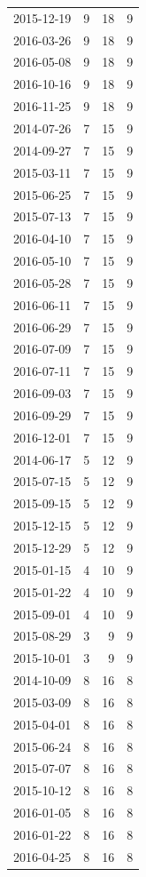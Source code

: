 \begin{tabular}{lrrr}
2015-12-19 & 9 & 18 & 9 \\
2016-03-26 & 9 & 18 & 9 \\
2016-05-08 & 9 & 18 & 9 \\
2016-10-16 & 9 & 18 & 9 \\
2016-11-25 & 9 & 18 & 9 \\
2014-07-26 & 7 & 15 & 9 \\
2014-09-27 & 7 & 15 & 9 \\
2015-03-11 & 7 & 15 & 9 \\
2015-06-25 & 7 & 15 & 9 \\
2015-07-13 & 7 & 15 & 9 \\
2016-04-10 & 7 & 15 & 9 \\
2016-05-10 & 7 & 15 & 9 \\
2016-05-28 & 7 & 15 & 9 \\
2016-06-11 & 7 & 15 & 9 \\
2016-06-29 & 7 & 15 & 9 \\
2016-07-09 & 7 & 15 & 9 \\
2016-07-11 & 7 & 15 & 9 \\
2016-09-03 & 7 & 15 & 9 \\
2016-09-29 & 7 & 15 & 9 \\
2016-12-01 & 7 & 15 & 9 \\
2014-06-17 & 5 & 12 & 9 \\
2015-07-15 & 5 & 12 & 9 \\
2015-09-15 & 5 & 12 & 9 \\
2015-12-15 & 5 & 12 & 9 \\
2015-12-29 & 5 & 12 & 9 \\
2015-01-15 & 4 & 10 & 9 \\
2015-01-22 & 4 & 10 & 9 \\
2015-09-01 & 4 & 10 & 9 \\
2015-08-29 & 3 & 9 & 9 \\
2015-10-01 & 3 & 9 & 9 \\
2014-10-09 & 8 & 16 & 8 \\
2015-03-09 & 8 & 16 & 8 \\
2015-04-01 & 8 & 16 & 8 \\
2015-06-24 & 8 & 16 & 8 \\
2015-07-07 & 8 & 16 & 8 \\
2015-10-12 & 8 & 16 & 8 \\
2016-01-05 & 8 & 16 & 8 \\
2016-01-22 & 8 & 16 & 8 \\
2016-04-25 & 8 & 16 & 8 \\

\end{tabular}
